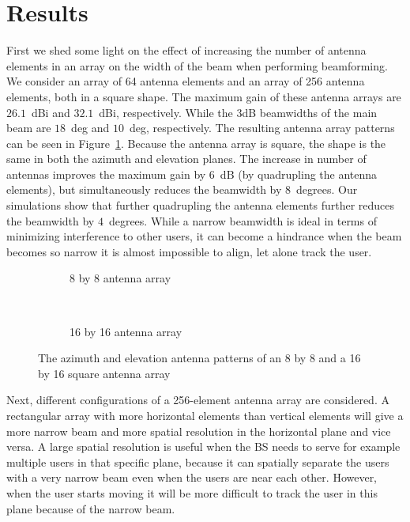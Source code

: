 \documentclass[conference,twocolumn]{IEEEtran}
\begin{document}
\section{Results}
\par First we shed some light on the effect of increasing the number of antenna elements in an array on the width of the beam when performing beamforming. We consider an array of 64 antenna elements and an array of 256 antenna elements, both in a square shape. The maximum gain of these antenna arrays are $26.1$~dBi and $32.1$~dBi, respectively. While the $3$dB beamwidths of the main beam are $18$~deg and $10$~deg, respectively. The resulting antenna array patterns can be seen in Figure~\ref{fig:antenna_increase}. Because the antenna array is square, the shape is the same in both the azimuth and elevation planes. The increase in number of antennas improves the maximum gain by $6$~dB (by quadrupling the antenna elements), but simultaneously reduces the beamwidth by $8$~degrees. Our simulations show that further quadrupling the antenna elements further reduces the beamwidth by $4$~degrees. While a narrow beamwidth is ideal in terms of minimizing interference to other users, it can become a hindrance when the beam becomes so narrow it is almost impossible to align, let alone track the user.
\begin{figure}[t]
\centering
\begin{subfigure}[t]{0.5\linewidth}

\caption{8 by 8 antenna array}
\end{subfigure}~
\begin{subfigure}[t]{0.5\linewidth}

\caption{16 by 16 antenna array}
\end{subfigure}
\caption{The azimuth and elevation antenna patterns of an 8 by 8 and a 16 by 16 square antenna array}
\label{fig:antenna_increase}
\end{figure}
\par Next, different configurations of a 256-element antenna array are considered. A rectangular array with more horizontal elements than vertical elements will give a more narrow beam and more spatial resolution in the horizontal plane and vice versa. A large spatial resolution is useful when the BS needs to serve for example multiple users in that specific plane, because it can spatially separate the users with a very narrow beam even when the users are near each other. However, when the user starts moving it will be more difficult to track the user in this plane because of the narrow beam.
\end{document}
